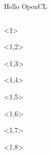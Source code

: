 \documentclass[@BEAMER_OPTIONS@]{beamer}
\begin{document}
\begin{frame}[fragile]{Hello OpenCL}
    \vspace{-1\baselineskip}
    \begin{columns}
        \begin{column}[c]{0.25\textwidth}
            \begin{exampleblock}{}
                \begin{adjustbox}{width=0.25\textwidth, height=\textheight, keepaspectratio}
                    \begin{minipage}{\textwidth}
                        \begin{uncoverenv}<1>
                            
                        \end{uncoverenv}
                        \begin{uncoverenv}<1,2>
                            
                        \end{uncoverenv}
                        \begin{uncoverenv}<1,3>
                            
                        \end{uncoverenv}
                        \begin{uncoverenv}<1,4>
                            
                        \end{uncoverenv}
                        \begin{uncoverenv}<1,5>
                            
                        \end{uncoverenv}
                        \begin{uncoverenv}<1,6>
                            
                        \end{uncoverenv}
                        \begin{uncoverenv}<1,7>
                            
                        \end{uncoverenv}
                        \begin{uncoverenv}<1,8>

\end{uncoverenv}
\end{minipage}
\end{adjustbox}
\end{exampleblock}
\end{column}
\end{columns}
\end{frame}
\end{document}
